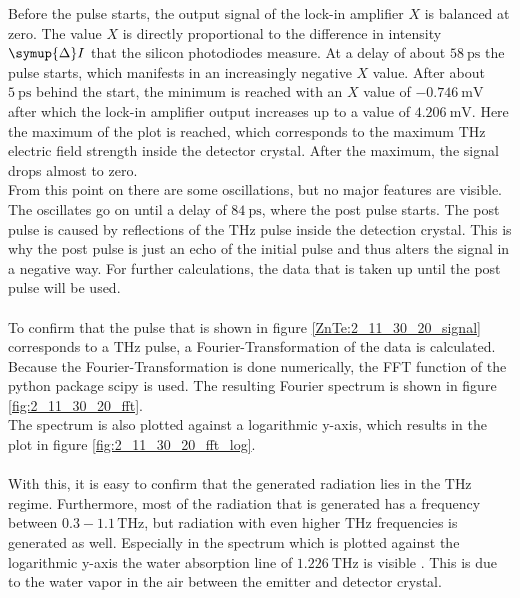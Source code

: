 \FloatBarrier
Before the pulse starts, the output signal of the lock-in amplifier $X$ is balanced at zero.
The value $X$ is directly proportional to the difference in intensity $\symup{\Delta} I$ that the silicon photodiodes measure.
At a delay of about $\SI{58}{\pico\second}$ the pulse starts, which manifests in an increasingly negative $X$ value.
After about $\SI{5}{\pico\second}$ behind the start, the minimum is reached with an $X$ value of $\SI{-0.746}{\milli\V}$ after which the lock-in amplifier output increases up to a value of $\SI{4.206}{\milli\V}$.
Here the maximum of the plot is reached, which corresponds to the maximum $\si{\tera\hertz}$ electric field strength inside the detector crystal.
After the maximum, the signal drops almost to zero.
\\
From this point on there are some oscillations, but no major features are visible. %
The oscillates go on until a delay of $\SI{84}{\pico\second}$, where the post pulse starts.
The post pulse is caused by reflections of the $\si{\tera\hertz}$ pulse inside the detection crystal.
This is why the post pulse is just an echo of the initial pulse and thus alters the signal in a negative way.
For further calculations, the data that is taken up until the post pulse will be used.
\\\\
To confirm that the pulse that is shown in figure \ref{ZnTe:2_11_30_20_signal} corresponds to a $\si{\tera\hertz}$ pulse, a Fourier-Transformation of the data is calculated. %
Because the Fourier-Transformation is done numerically, the FFT function of the python package scipy \cite{scipy} is used.
The resulting Fourier spectrum is shown in figure \ref{fig:2_11_30_20_fft}.
\\
The spectrum is also plotted against a logarithmic y-axis, which results in the plot in figure \ref{fig:2_11_30_20_fft_log}.
\\\\
With this, it is easy to confirm that the generated radiation lies in the $\si{\tera\hertz}$ regime.
Furthermore, most of the radiation that is generated has a frequency between $0.3-1.1\,\si{\tera\hertz}$, but radiation with even higher $\si{\tera\hertz}$ frequencies is generated as well.
Especially in the spectrum which is plotted against the logarithmic y-axis the water absorption line of $\SI{1.226}{\tera\hertz}$ is visible \cite{water_absorption}.
This is due to the water vapor in the air between the emitter and detector crystal.
